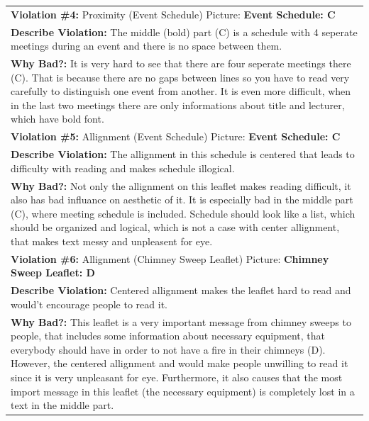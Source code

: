 \documentclass[a4paper,11pt,oneside]{scrreprt}
\begin{document}
\begin{tabularx}{\textwidth}{|X|}
	\hline	
	
	\textbf{Violation \#4:} Proximity (Event Schedule)
	Picture: \textbf{Event Schedule: C}
	\\
	\textbf{Describe Violation:} The middle (bold) part (C) is a schedule with 4 seperate meetings during an event and there is no space between them.
	
	\\
	\textbf{Why Bad?:} It is very hard to see that there are four seperate meetings there (C). That is because there are no gaps between lines so you have to read very carefully to distinguish one event from another. It is even more difficult, when in the last two meetings there are only informations about title and lecturer, which have bold font.
	
	\\
	\hline	
	
	\textbf{Violation \#5:} Allignment (Event Schedule)
	Picture: \textbf{Event Schedule: C}
	
	\\
	\textbf{Describe Violation:} The allignment in this schedule is centered that leads to difficulty with reading and makes schedule illogical. 
	
	\\
	\textbf{Why Bad?:} Not only the allignment on this leaflet makes reading difficult, it also has bad influance on aesthetic of it. It is especially bad in the middle part (C), where meeting schedule is included. Schedule should look like a list, which should be organized and logical, which is not a case with center allignment, that makes text messy and unpleasent for eye.
	
	\\
	\hline	
	
	\textbf{Violation \#6:} Allignment (Chimney Sweep Leaflet)
	Picture: \textbf{Chimney Sweep Leaflet: D}
	\\
	\textbf{Describe Violation:} Centered allignment makes the leaflet hard to read and would't encourage people to read it.
	
	\\
	\textbf{Why Bad?:} This leaflet is a very important message from chimney sweeps to people, that includes some information about necessary equipment, that everybody should have in order to not have a fire in their chimneys (D). However, the centered allignment and would make people unwilling to read it since it is very unpleasant for eye. Furthermore, it also causes that the most import message in this leaflet (the necessary equipment) is completely lost in a text in the middle part.
	
	\\
	\hline	
	
\end{tabularx}\\
\end{document}
